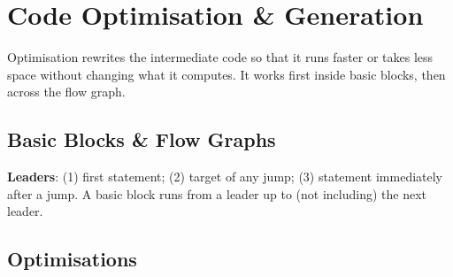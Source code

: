 \needspace{191pt}

\hypertarget{p2-08--14-code-optimisation--generation}{%
\section{Code Optimisation \& Generation}\label{p2-08--14-code-optimisation--generation}}

Optimisation rewrites the intermediate code so that it runs faster or takes less space without changing what it
computes. It works first inside basic blocks, then across the flow graph.

\needspace{125pt}

\hypertarget{p2-08--141-basic-blocks--flow-graphs}{%
\subsection{Basic Blocks \& Flow Graphs}\label{p2-08--141-basic-blocks--flow-graphs}}

\textbf{Leaders}: (1) first statement; (2) target of any jump; (3) statement immediately after a jump. A basic block runs from a leader up to (not including) the next leader.



\needspace{130pt}

\hypertarget{p2-08--142-optimisations}{%
\subsection{Optimisations}\label{p2-08--142-optimisations}}

\begingroup\small

